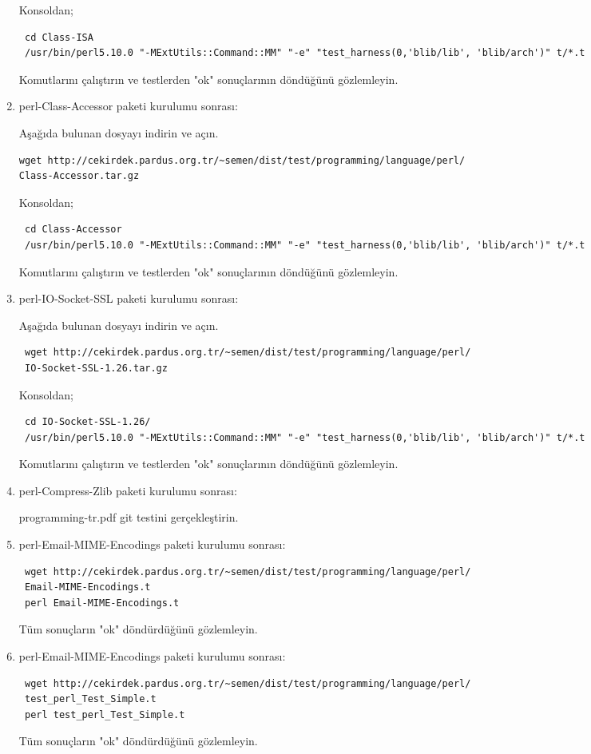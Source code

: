 \documentclass[a4paper,10pt]{article}
\begin{document}
\begin{enumerate}
Konsoldan;
\begin{verbatim}
 cd Class-ISA
 /usr/bin/perl5.10.0 "-MExtUtils::Command::MM" "-e" "test_harness(0,'blib/lib', 'blib/arch')" t/*.t
\end{verbatim}

Komutlarını çalıştırın ve testlerden "ok" sonuçlarının döndüğünü gözlemleyin.

\item perl-Class-Accessor paketi kurulumu sonrası:

Aşağıda bulunan dosyayı indirin ve açın.
\begin{verbatim}
wget http://cekirdek.pardus.org.tr/~semen/dist/test/programming/language/perl/
Class-Accessor.tar.gz
\end{verbatim}

Konsoldan;
\begin{verbatim}
 cd Class-Accessor
 /usr/bin/perl5.10.0 "-MExtUtils::Command::MM" "-e" "test_harness(0,'blib/lib', 'blib/arch')" t/*.t
\end{verbatim}

Komutlarını çalıştırın ve testlerden "ok" sonuçlarının döndüğünü gözlemleyin.


\item perl-IO-Socket-SSL paketi kurulumu sonrası:

Aşağıda bulunan dosyayı indirin ve açın.
\begin{verbatim}
 wget http://cekirdek.pardus.org.tr/~semen/dist/test/programming/language/perl/
 IO-Socket-SSL-1.26.tar.gz
\end{verbatim}

Konsoldan;
\begin{verbatim}
 cd IO-Socket-SSL-1.26/
 /usr/bin/perl5.10.0 "-MExtUtils::Command::MM" "-e" "test_harness(0,'blib/lib', 'blib/arch')" t/*.t
\end{verbatim}

Komutlarını çalıştırın ve testlerden "ok" sonuçlarının döndüğünü gözlemleyin.
\item perl-Compress-Zlib paketi kurulumu sonrası:

programming-tr.pdf git testini gerçekleştirin.

\item perl-Email-MIME-Encodings paketi kurulumu sonrası:
\begin{verbatim}
 wget http://cekirdek.pardus.org.tr/~semen/dist/test/programming/language/perl/
 Email-MIME-Encodings.t
 perl Email-MIME-Encodings.t
\end{verbatim}

Tüm sonuçların "ok" döndürdüğünü gözlemleyin. 

\item perl-Email-MIME-Encodings paketi kurulumu sonrası:
\begin{verbatim}
 wget http://cekirdek.pardus.org.tr/~semen/dist/test/programming/language/perl/
 test_perl_Test_Simple.t
 perl test_perl_Test_Simple.t
\end{verbatim}

Tüm sonuçların "ok" döndürdüğünü gözlemleyin. 


\end{enumerate}
\end{document}
